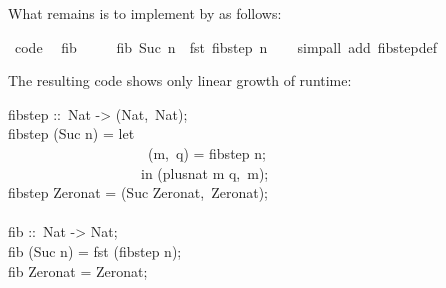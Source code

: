 \begin{isabellebody}
\endisatagquote
{\isafoldquote}%
%
\isadelimquote
%
\endisadelimquote
%
\begin{isamarkuptext}%
\noindent What remains is to implement  by  as follows:%
\end{isamarkuptext}%
\isamarkuptrue%
%
\isadelimquote
%
\endisadelimquote
%
\isatagquote
{}\isamarkupfalse%
\ {\isacharbrackleft}code{\isacharbrackright}{\isacharcolon}\isanewline
\ \ {\isachardoublequoteopen}fib\ {}\ {\isacharequal}\ {}{\isachardoublequoteclose}\isanewline
\ \ {\isachardoublequoteopen}fib\ {\isacharparenleft}Suc\ n{\isacharparenright}\ {\isacharequal}\ fst\ {\isacharparenleft}fib{\isacharunderscore}step\ n{\isacharparenright}{\isachardoublequoteclose}\isanewline
\ \ \isamarkupfalse%
\ {\isacharparenleft}simp{\isacharunderscore}all\ add{\isacharcolon}\ fib{\isacharunderscore}step{\isacharunderscore}def{\isacharparenright}%
\endisatagquote
{\isafoldquote}%
%
\isadelimquote
%
\endisadelimquote
%
\begin{isamarkuptext}%
\noindent The resulting code shows only linear growth of runtime:%
\end{isamarkuptext}%
\isamarkuptrue%
%
\isadelimquote
%
\endisadelimquote
%
\isatagquote
%
\begin{isamarkuptext}%
\isatypewriter%
\noindent%
\hspace*{0pt}fib{}step ::~Nat -> (Nat,~Nat);\\
\hspace*{0pt}fib{}step (Suc n) = let {}\\
\hspace*{0pt} ~~~~~~~~~~~~~~~~~~~~(m,~q) = fib{}step n;\\
\hspace*{0pt} ~~~~~~~~~~~~~~~~~~{}~in (plus{}nat m q,~m);\\
\hspace*{0pt}fib{}step Zero{}nat = (Suc Zero{}nat,~Zero{}nat);\\
\hspace*{0pt}\\
\hspace*{0pt}fib ::~Nat -> Nat;\\
\hspace*{0pt}fib (Suc n) = fst (fib{}step n);\\
\hspace*{0pt}fib Zero{}nat = Zero{}nat;%
\end{isamarkuptext}%

\end{isabellebody}
